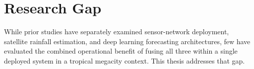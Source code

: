 \section{Research Gap}
While prior studies have separately examined sensor-network deployment, satellite rainfall estimation, and deep learning forecasting architectures, few have evaluated the combined operational benefit of fusing all three within a single deployed system in a tropical megacity context. This thesis addresses that gap.

